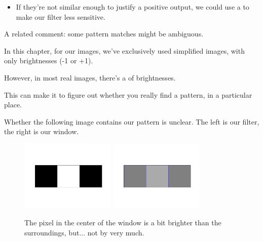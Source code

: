         \begin{itemize}
            \item If they're not similar enough to justify a positive output, we could use a  to make our filter less sensitive.
        \end{itemize}

        A related comment: some pattern matches might be ambiguous.\\

        \begin{clarification}
            In this chapter, for our images, we've exclusively used simplified images, with only  brightnesses (-1 or +1).

            However, in most real images, there's a  of brightnesses.

            This can make it  to figure out whether you really find a pattern, in a particular place.
        \end{clarification}

        \miniex Whether the following image contains our pattern is unclear. The left is our filter, the right is our window.

        \begin{figure}[H]
            \centering
            \includegraphics[width=45mm,scale=0.5]{images/convolutional_neural_networks_images/1d_filter.png}
            \includegraphics[width=45mm,scale=0.5]{images/convolutional_neural_networks_images/gray_centerbright.png}
            
            \caption*{The pixel in the center of the window is a bit brighter than the surroundings, but... not by very much.}
        \end{figure}

